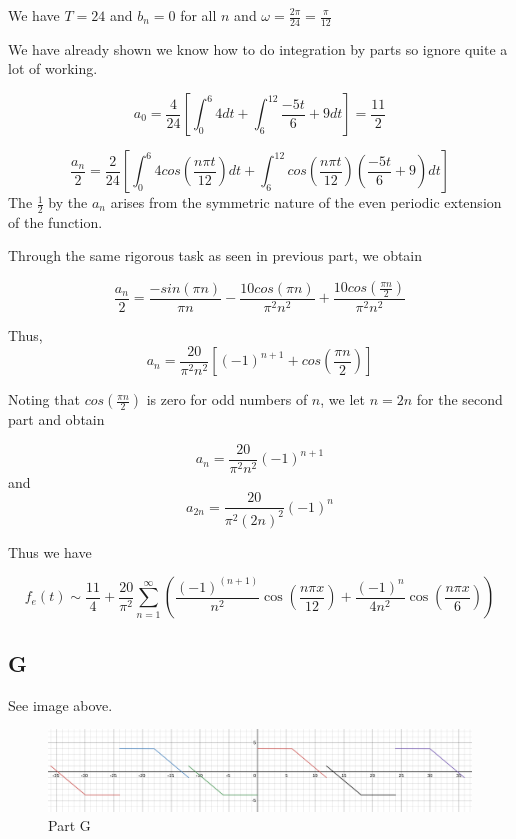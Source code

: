 \documentclass{article}
\begin{document}
We have $T=24$ and $b_n=0$ for all $n$ and $\omega = \frac{2\pi}{24} = \frac{\pi}{12}$

We have already shown we know how to do integration by parts so ignore quite a lot of working.

$$
a_0 = \frac{4}{24} \left[ \int_0^6 4 dt + \int_6^{12} \frac{-5t}{6} + 9 dt \right] = \frac{11}{2}
$$

$$
\frac{a_n}{2} = \frac{2}{24} \left[ \int_0^{6} 4 cos\left( \frac{n \pi t}{12} \right) dt + \int_6^{12} cos\left(\frac{n \pi t}{12}\right)\left(\frac{-5t}{6}+9\right)dt\right]
$$
The $\frac{1}{2}$ by the $a_n$ arises from the symmetric nature of the even periodic extension of the function.

Through the same rigorous task as seen in previous part, we obtain

$$
\frac{a_n}{2} = \frac{-sin(\pi n)}{\pi n} - \frac{10cos(\pi n)}{\pi^2 n^2} + \frac{10cos(\frac{\pi n}{2})}{\pi^2 n^2}
$$

Thus,
$$
a_n =\frac{20}{\pi^2n^2} \left[ \left(-1\right)^{n+1} +cos\left(\frac{\pi n}{2}\right) \right]
$$

Noting that $cos\left(\frac{\pi n}{2}\right)$ is zero for odd numbers of $n$, we let $n=2n$ for the second part and obtain

$$
a_n  =\frac{20}{\pi^2n^2} \left(-1\right)^{n+1}
$$
and
$$
a_{2n} = \frac{20}{\pi^2 (2n)^2} \left(-1\right)^{n}
$$

Thus we have

$$
f_e(t) \sim \frac{11}{4}+\frac{20}{\pi^{2}}\sum_{n=1}^{\infty}\left(\frac{\left(-1\right)^{\left(n+1\right)}}{n^{2}}\cos\left(\frac{n\pi x}{12}\right)+\frac{\left(-1\right)^{n}}{4n^{2}}\cos\left(\frac{n\pi x}{6}\right)\right)
$$

\subsection*{G}

See image above.

\begin{figure}
\centering
\includegraphics[width=1.0\textwidth]{./static/graph5.png}
\caption{Part G}
\end{figure}
\end{document}
